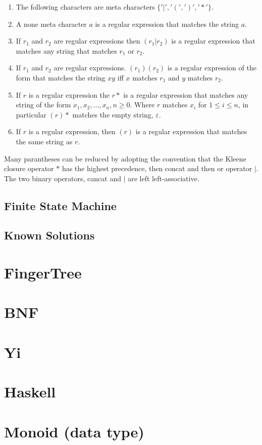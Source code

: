 \begin{definition}
\begin{enumerate}
  \item The following characters are meta characters $\{ '|', '(', ')', '*' \}$.
  \item A none meta character $a$ is a regular expression that matches the 
      string $a$.
  \item If $r_1$ and $r_2$ are regular expressions then $(r_1 | r_2)$ is a 
      regular expression that matches any string that matches $r_1$ or $r_2$.
  \item If $r_1$ and $r_2$ are regular expressions. $(r_1)(r_2)$ is a regular
      expression of the form that matches the string $xy$ iff $x$ matches $r_1$
      and $y$ matches $r_2$.
  \item If $r$ is a regular expression the $r*$ is a regular expression that
      matches any string of the form $x_1, x_2, \dots , x_n, n \geq 0$.
      Where $r$ matches $x_i$ for $1 \leq i \leq n$, in particular $(r)*$ 
      matches the empty string, $\varepsilon$.
  \item If $r$ is a regular expression, then $(r)$ is a regular expression that
      matches the same string as $r$.
\end{enumerate}
\end{definition}
Many parantheses can be reduced by adopting the convention that the Kleene
closure operator $*$ has the highest precedence, then concat and then or
operator $|$. The two binary operators, cancat and $|$ are left 
left-associative. \cite{Aho}
\subsection{Finite State Machine}
\subsection{Known Solutions}
\section{FingerTree}
\section{BNF}
\section{Yi}
\section{Haskell}
\section{Monoid (data type)}

 

